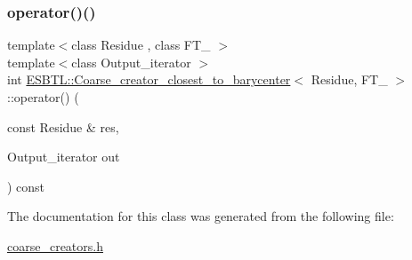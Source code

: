 \subsubsection{\texorpdfstring{operator()()}{operator()()}}
{\footnotesize\ttfamily template$<$class Residue , class F\+T\+\_\+ $>$ \\
template$<$class Output\+\_\+iterator $>$ \\
int \hyperlink{classESBTL_1_1Coarse__creator__closest__to__barycenter}{E\+S\+B\+T\+L\+::\+Coarse\+\_\+creator\+\_\+closest\+\_\+to\+\_\+barycenter}$<$ Residue, F\+T\+\_\+ $>$\+::operator() (\begin{DoxyParamCaption}\item[{const Residue \&}]{res,  }\item[{Output\+\_\+iterator}]{out }\end{DoxyParamCaption}) const\hspace{0.3cm}{\ttfamily [inline]}}



The documentation for this class was generated from the following file\+:\begin{DoxyCompactItemize}
\item 
\hyperlink{coarse__creators_8h}{coarse\+\_\+creators.\+h}\end{DoxyCompactItemize}
